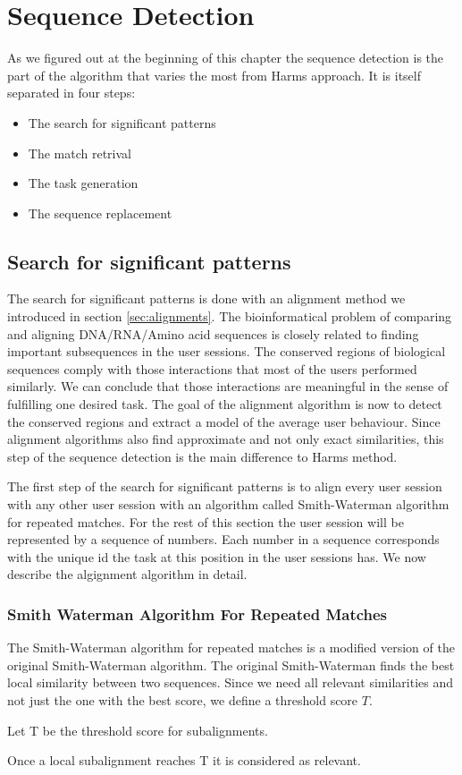 \section{Sequence Detection}
As we figured out at the beginning of this chapter the sequence detection is the part of the algorithm that varies the most from Harms approach.
It is itself separated in four steps:
\begin{itemize}
	\item The search for significant patterns
	\item The match retrival
	\item The task generation
	\item The sequence replacement
\end{itemize}

\subsection{Search for significant patterns}		
The search for significant patterns is done with an alignment method we introduced in section \ref{sec:alignments}. 
The bioinformatical problem of comparing and aligning DNA/RNA/Amino acid sequences is closely related to finding important subsequences in the user sessions. 
The conserved regions of biological sequences comply with those interactions that most of the users performed similarly. 
We can conclude that those interactions are meaningful in the sense of fulfilling one desired task.
The goal of the alignment algorithm is now to detect the conserved regions and extract a model of the average user behaviour. 
Since alignment algorithms also find approximate and not only exact similarities, this step of the sequence detection is the main difference to Harms method.

The first step of the search for significant patterns is to align every user session with any other user session with an algorithm called Smith-Waterman algorithm for repeated matches.
For the rest of this section the user session will be represented by a sequence of numbers. Each number in a sequence corresponds with the unique id the task at this position in the user sessions has.
We now describe the algignment algorithm in detail.

\subsubsection{Smith Waterman Algorithm For Repeated Matches}
The Smith-Waterman algorithm for repeated matches\cite{durbin1998} is a modified version of the original Smith-Waterman algorithm\cite{waterman1981}.
The original Smith-Waterman finds the best local similarity between two sequences.
Since we need all relevant similarities and not just the one with the best score, we define a threshold score $T$.
\begin{definition}
	Let T be the threshold score for subalignments.
	\label{def:treshold}
\end{definition}
Once a local subalignment reaches T it is considered as relevant.

